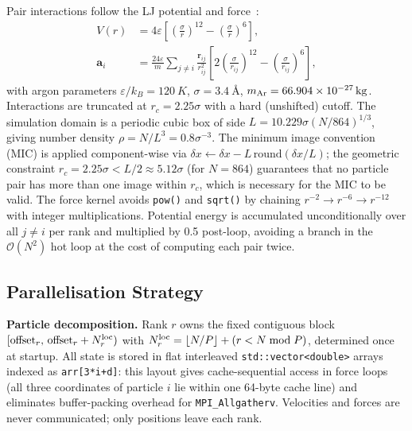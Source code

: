 \documentclass[10pt,twocolumn]{article}
\begin{document}
Pair interactions follow the LJ potential and force~\citep{Rahman1964}:
\begin{align}
  V(r) &= 4\varepsilon\!\left[\!\left(\tfrac{\sigma}{r}\right)^{12}\!
    -\left(\tfrac{\sigma}{r}\right)^6\right], \label{eq:lj_pot}\\
  \mathbf{a}_i &= \frac{24\varepsilon}{m}\!\sum_{j\ne i}\!
    \frac{\mathbf{r}_{ij}}{r_{ij}^2}
    \!\left[2\!\left(\tfrac{\sigma}{r_{ij}}\right)^{12}\!
    -\!\left(\tfrac{\sigma}{r_{ij}}\right)^6\right], \label{eq:lj_force}
\end{align}
with argon parameters $\varepsilon/k_B=\SI{120}{K}$,
$\sigma=\SI{3.4}{\text{\AA}}$, $m_{\rm Ar}=66.904\times10^{-27}\,\si{kg}$.
Interactions are truncated at $r_c=2.25\sigma$ with a hard (unshifted)
cutoff.
The simulation domain is a periodic cubic box of side
$L=10.229\sigma(N/864)^{1/3}$, giving number density
$\rho=N/L^3=0.8\sigma^{-3}$.
The minimum image convention (MIC) is applied component-wise via
$\delta x \leftarrow \delta x - L\,\mathrm{round}(\delta x / L)$;
the geometric constraint $r_c=2.25\sigma < L/2 \approx 5.12\sigma$
(for $N=864$) guarantees that no particle pair has more than one image
within $r_c$, which is necessary for the MIC to be valid.
The force kernel avoids \texttt{pow()} and \texttt{sqrt()} by chaining
$r^{-2}\to r^{-6}\to r^{-12}$ with integer multiplications.
Potential energy is accumulated unconditionally over all $j\ne i$ per rank
and multiplied by 0.5 post-loop, avoiding a branch in the
$\mathcal{O}(N^2)$ hot loop at the cost of computing each pair twice.

\subsection{Parallelisation Strategy}
\label{sec:parallel}

\textbf{Particle decomposition.}
Rank $r$ owns the fixed contiguous block
$[\text{offset}_r,\,\text{offset}_r + N_r^{\rm loc})$
with $N_r^{\rm loc} = \lfloor N/P\rfloor + (r < N\bmod P)$, determined
once at startup.
All state is stored in flat interleaved \texttt{std::vector<double>} arrays
indexed as \texttt{arr[3*i+d]}: this layout gives cache-sequential access
in force loops (all three coordinates of particle $i$ lie within one
64-byte cache line) and eliminates buffer-packing overhead for
\texttt{MPI\_Allgatherv}.
Velocities and forces are never communicated; only positions leave each rank.
\end{document}
